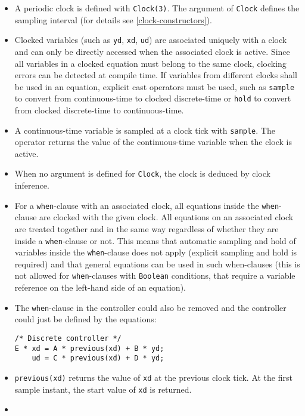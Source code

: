 \begin{itemize}
\item
  A periodic clock is defined with \lstinline!Clock(3)!. The argument
  of \lstinline!Clock! defines the sampling interval (for details see \cref{clock-constructors}).
\item
  Clocked variables (such as \lstinline!yd!, \lstinline!xd!, \lstinline!ud!) are associated uniquely
  with a clock and can only be directly accessed when the associated
  clock is active. Since all variables in a clocked equation must belong
  to the same clock, clocking errors can be detected at compile time. If
  variables from different clocks shall be used in an equation, explicit
  cast operators must be used, such as \lstinline!sample! to convert
  from continuous-time to clocked discrete-time or \lstinline!hold! to
  convert from clocked discrete-time to continuous-time.
\item
  A continuous-time variable is sampled at a clock tick with
  \lstinline!sample!. The operator returns the value of the
  continuous-time variable when the clock is active.
\item
  When no argument is defined for \lstinline!Clock!, the clock is
  deduced by clock inference.
\item
  For a \lstinline!when!-clause with an associated clock, all equations inside the \lstinline!when!-clause are clocked with the given clock.  All equations on an associated clock are treated together and in the same way regardless of whether they are inside a \lstinline!when!-clause or not.  This means that automatic sampling and hold of variables inside the \lstinline!when!-clause does not apply (explicit sampling and hold is required) and that general equations can be used in such when-clauses (this is not allowed for \lstinline!when!-clauses with \lstinline!Boolean! conditions, that require a variable reference on the left-hand side of an equation).
\item
  The \lstinline!when!-clause in the controller could also be removed
  and the controller could just be defined by the equations:
\begin{lstlisting}[language=modelica]
/* Discrete controller */
E * xd = A * previous(xd) + B * yd;
    ud = C * previous(xd) + D * yd;
\end{lstlisting}
\item
  \lstinline!previous(xd)! returns the value of \lstinline!xd! at
  the previous clock tick. At the first sample instant, the start value
  of \lstinline!xd! is returned.
\item

\end{itemize}
